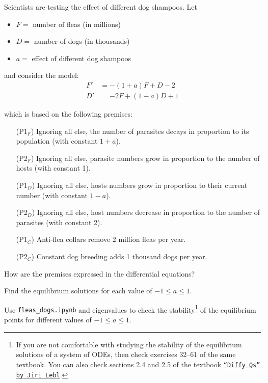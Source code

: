 \documentclass{workbook}
\begin{document}
\begin{slide}

\question

\begin{problem}\label{flea_dog}
Scientists are testing the effect of different dog shampoos. Let
\begin{itemize}
	\item $F = $ number of fleas (in millions)
	\item $D = $ number of dogs (in thousands)
	\item $a = $ effect of different dog shampoos
\end{itemize}
and consider the model: %
\begin{align*}
	F' & = -(1+a)F + D - 2 \\
	D' & = -2F + (1-a)D + 1
\end{align*}

which is based on the following premises:
\begin{itemize}
	\item[(P1$_F$)] Ignoring all else, the number of parasites decays in proportion to its population (with constant $1+a$).
	\item[(P2$_F$)] Ignoring all else, parasite numbers grow in proportion to the number of hosts (with constant 1).
\begin{slidesonly}
	\vspace{3cm}
\end{slidesonly}
	\item[(P1$_D$)] Ignoring all else, hosts numbers grow in proportion to their current number (with constant $1-a$).
	\item[(P2$_D$)] Ignoring all else, host numbers decrease in proportion to the number of parasites (with constant 2).
	\item[(P1$_C$)] Anti-flea collars remove 2 million fleas per year.
	\item[(P2$_C$)] Constant dog breeding adds 1 thousand dogs per year.
\end{itemize}
\end{problem}

\begin{parts}
	\item How are the premises expressed in the differential equations?
	\item Find the equilibrium solutions for each value of $-1 \leq a \leq 1$.
	\item Use \href{https://utoronto.syzygy.ca/jupyter/user-redirect/git-pull?repo=https://github.com/bigfatbernie/IBLMathModeling&subPath=python/fleas_dogs.ipynb}{\tt fleas_dogs.ipynb} and eigenvalues to check the stability\footnote{If you are not comfortable with studying the stability of the equilibrium solutions of a system of ODEs, then check exercises 32--61 of the same textbook. You can also check sections 2.4 and 2.5 of the textbook \href{https://raw.githubusercontent.com/siefkenj/IBLODEs/main/diffyqs-by-jiri-lebl/diffyqs.pdf}{\tt ``Diffy Qs'' by Jiri Lebl}.} of the equilibrium points for different values of $-1 \leq a \leq 1$.
\end{parts}





\end{slide}
\end{document}
